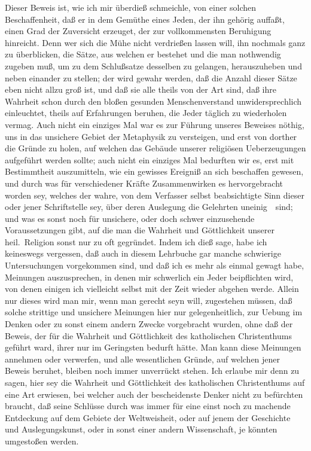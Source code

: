\begin{aufza}
\item Dieser Beweis ist, wie ich mir überdieß schmeichle, von einer solchen Beschaffenheit, daß er in dem Gemüthe eines Jeden, der ihn gehörig auffaßt, einen Grad der Zuversicht erzeuget, der zur vollkommensten Beruhigung hinreicht. Denn wer sich die Mühe nicht verdrießen lassen will, ihn nochmals ganz zu überblicken, die Sätze, aus welchen er bestehet und die man nothwendig zugeben muß, um zu dem Schlußsatze desselben zu gelangen, herauszuheben und neben einander zu stellen; der wird gewahr werden, daß die Anzahl dieser Sätze eben nicht allzu groß ist, und daß sie alle theils von der Art sind, daß ihre Wahrheit schon durch den bloßen gesunden Menschenverstand unwidersprechlich einleuchtet, theils auf Erfahrungen beruhen, die Jeder täglich zu wiederholen vermag. Auch nicht ein einziges Mal war es zur Führung unseres Beweises nöthig, uns in das unsichere Gebiet der Metaphysik zu versteigen, und erst von dorther die Gründe zu holen, auf welchen das Gebäude unserer religiösen Ueberzeugungen aufgeführt werden sollte; auch nicht ein einziges Mal bedurften wir es, erst mit Bestimmtheit auszumitteln, wie ein gewisses Ereigniß an sich beschaffen gewesen, und durch was für verschiedener Kräfte Zusammenwirken es hervorgebracht worden sey, welches der wahre, von dem Verfasser selbst beabsichtigte Sinn dieser oder jener Schriftstelle sey, über deren Auslegung die Gelehrten uneinig~\ sind; und was es sonst noch für unsichere, oder doch schwer einzusehende Voraussetzungen gibt, auf die man die Wahrheit und Göttlichkeit unserer heil.\ Religion sonst nur zu oft gegründet. Indem ich dieß sage, habe ich keineswegs vergessen, daß auch in diesem Lehrbuche gar manche schwierige Untersuchungen vorgekommen sind, und daß ich es mehr als einmal gewagt habe, Meinungen auszusprechen, in denen mir schwerlich ein Jeder beipflichten wird, von denen einigen ich vielleicht selbst mit der Zeit wieder abgehen werde. Allein nur dieses wird man mir, wenn man gerecht seyn will, zugestehen müssen, daß solche strittige und unsichere Meinungen hier nur gelegenheitlich, zur Uebung im Denken oder zu sonst einem andern Zwecke vorgebracht wurden, ohne daß der Beweis, der für die Wahrheit und Göttlichkeit des katholischen Christenthums geführt ward, ihrer nur im Geringsten bedurft hätte. Man kann diese Meinungen annehmen oder verwerfen, und alle wesentlichen Gründe, auf welchen jener Beweis beruhet, bleiben noch immer unverrückt stehen. Ich erlaube mir denn zu sagen, hier sey die Wahrheit und Göttlichkeit des katholischen Christenthums auf eine Art erwiesen, bei welcher auch der bescheidenste Denker nicht zu befürchten braucht, daß seine Schlüsse durch was immer für eine einst noch zu machende Entdeckung auf dem Gebiete der Weltweisheit, oder auf jenem der Geschichte und Auslegungskunst, oder in sonst einer andern Wissenschaft, je könnten umgestoßen werden.
\end{aufza}

